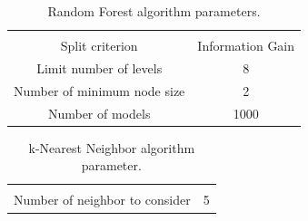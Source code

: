 \begin{table}[h]
	{\setlength{\tabcolsep}{12pt}
		\caption{Random Forest algorithm parameters.}
		\begin{center}
			\vspace{-6mm}
			\begin{tabular}{cc}
				\hline \\[-2.45ex] \hline \\[-2.1ex]
				Split criterion & Information Gain \\
				Limit number of levels & 8 \\
				Number of minimum node size & 2 \\
				Number of models & 1000\\
				\hline
			\end{tabular}
			\vspace{-6mm}
		\end{center}
		\label{rf}}
\end{table}

\begin{table}[!h]
	{\setlength{\tabcolsep}{12pt}
		\caption{k-Nearest Neighbor algorithm parameter.}
		\begin{center}
			\vspace{-6mm}
			\begin{tabular}{cc}
				\hline \\[-2.45ex] \hline \\[-2.1ex]
				Number of neighbor to consider & 5\\
				\hline
			\end{tabular}
			\vspace{-6mm}
		\end{center}
		\label{knn}}
\end{table}





